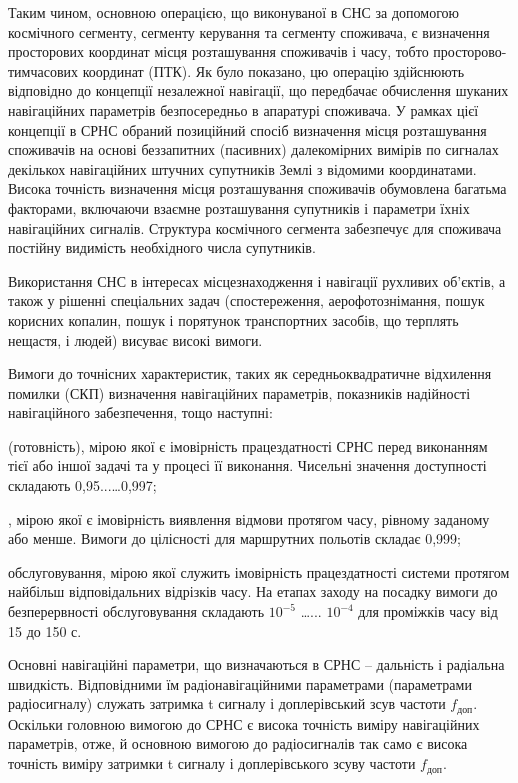 Таким чином, основною операцією, що виконуваної в СНС за допомогою космічного сегменту, сегменту 
керування та сегменту споживача, є визначення просторових координат місця розташування споживачів і 
часу, тобто просторово-тимчасових координат (ПТК). Як було показано, цю операцію здійснюють відповідно 
до концепції незалежної навігації, що передбачає обчислення шуканих навігаційних параметрів 
безпосередньо в апаратурі споживача. У рамках цієї концепції в СРНС обраний позиційний спосіб 
визначення місця розташування споживачів на основі беззапитних (пасивних) далекомірних вимірів по 
сигналах декількох навігаційних штучних супутників Землі з відомими координатами. Висока точність 
визначення місця розташування споживачів обумовлена багатьма факторами, включаючи взаємне розташування 
супутників і параметри їхніх навігаційних сигналів. Структура космічного сегмента забезпечує для 
споживача постійну видимість необхідного числа супутників.

Використання СНС в інтересах місцезнаходження і навігації рухливих об'єктів, а також у рішенні 
спеціальних задач (спостереження, аерофотознімання, пошук корисних копалин, пошук і порятунок 
транспортних засобів, що терплять нещастя, і людей) висуває високі вимоги.

Вимоги до точнісних характеристик, таких як середньоквадратичне відхилення помилки (СКП) визначення 
навігаційних параметрів, показників надійності навігаційного забезпечення, тощо наступні:
\begin{itemize}
   (готовність),  мірою якої є імовірність працездатності СРНС перед виконанням 
тієї або іншої задачі та у процесі її виконання. Чисельні значення доступності складають 0,95...\dots 0,997;

 , мірою якої є імовірність виявлення відмови протягом часу, рівному заданому 
або менше. Вимоги до цілісності для маршрутних польотів складає 0,999;

  обслуговування, мірою якої служить імовірність працездатності системи 
протягом найбільш відповідальних відрізків часу. На етапах заходу на посадку вимоги до безперервності 
обслуговування складають $10^{-5}$ \dots ... $10^{-4}$ для проміжків часу від 15 до 150 с.
\end{itemize}


Основні навігаційні параметри, що визначаються в СРНС -- дальність і радіальна швидкість. Відповідними 
їм радіонавігаційними параметрами (параметрами радіосигналу) служать затримка t сигналу і доплерівський 
зсув частоти $f_\text{доп}$. Оскільки головною вимогою до СРНС є висока точність виміру 
навігаційних параметрів, отже, й основною вимогою до радіосигналів так само є висока точність 
виміру затримки t сигналу і доплерівського зсуву частоти $f_\text{доп}$.

